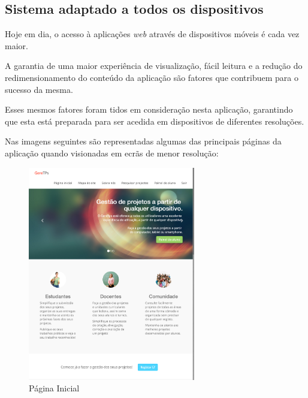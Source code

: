 \subsection{Sistema adaptado a todos os dispositivos}
Hoje em dia, o acesso à aplicações \textit{web} através de dispositivos móveis é cada vez maior.

A garantia de uma maior experiência de visualização, fácil leitura e a redução do redimensionamento do conteúdo da aplicação são fatores que contribuem para o sucesso da mesma.

Esses mesmos fatores foram tidos em consideração nesta aplicação, garantindo que esta está preparada para ser acedida em dispositivos de diferentes resoluções.

Nas imagens seguintes são representadas algumas das principais páginas da aplicação quando visionadas em ecrãs de menor resolução:

\begin{figure}[H]
	\centering
 	\includegraphics[width=0.65\textwidth,center]{images/implementacao/alunos/home}
 	\caption{Página Inicial}
 	\label{fig:home_smal}
 \end{figure}

